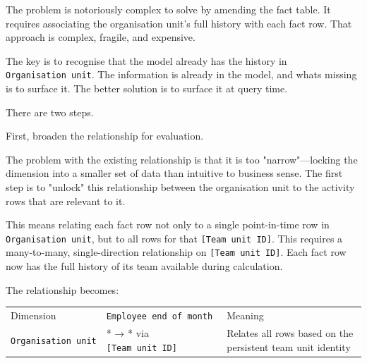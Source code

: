 \documentclass[10pt,openany,10pt]{book}
\newcounter{none}
\let\podeToprule\toprule
\let\podeMidrule\midrule
\let\podeBottomrule\bottomrule
\renewcommand{\toprule}{\arrayrulecolor{pbiGrid}\podeToprule}
\renewcommand{\midrule}{\arrayrulecolor{pbiGrid}\podeMidrule}
\renewcommand{\bottomrule}{\arrayrulecolor{pbiGrid}\podeBottomrule}
\begin{document}
The problem is notoriously complex to solve by amending the fact table.
It requires associating the organisation unit's full history with each
fact row. That approach is complex, fragile, and expensive.

The key is to recognise that the model already has the history in
\texttt{\textquotesingle{}Organisation\ unit\textquotesingle{}}. The
information is already in the model, and what\textquotesingle s missing
is to surface it. The better solution is to surface it at query time.

There are two steps.

First, broaden the relationship for evaluation.

The problem with the existing relationship is that it is too
"narrow"---locking the dimension into a smaller set of data than
intuitive to business sense. The first step is to "unlock" this
relationship between the organisation unit to the activity rows that are
relevant to it.

This means relating each fact row not only to a single point-in-time row
in \texttt{\textquotesingle{}Organisation\ unit\textquotesingle{}}, but
to all rows for that \texttt{{[}Team\ unit\ ID{]}}. This requires a
many-to-many, single-direction relationship on
\texttt{{[}Team\ unit\ ID{]}}. Each fact row now has the full history of
its team available during calculation.

The relationship becomes:

{\def\LTcaptype{none} %
\begin{longtable}[]{@{}
  >{\raggedright\arraybackslash}p{}
  >{\raggedright\arraybackslash}p{}
  >{\raggedright\arraybackslash}p{}@{}}
\toprule\noalign{}
\begin{minipage}[b]{\linewidth}\raggedright
Dimension
\end{minipage} & \begin{minipage}[b]{\linewidth}\raggedright
\texttt{\textquotesingle{}Employee\ end\ of\ month\textquotesingle{}}
\end{minipage} & \begin{minipage}[b]{\linewidth}\raggedright
Meaning
\end{minipage} \\
\midrule\noalign{}
\endhead
\bottomrule\noalign{}
\endlastfoot
\texttt{\textquotesingle{}Organisation\ unit\textquotesingle{}} & * → *
via \texttt{{[}Team\ unit\ ID{]}} & Relates all rows based on the
persistent team unit identity \\
\end{longtable}
}
\end{document}
